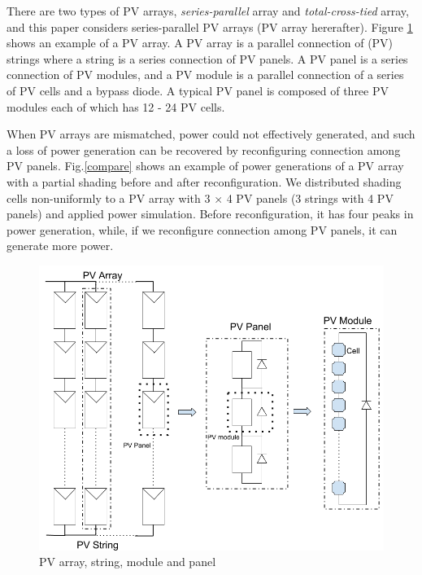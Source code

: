 \documentclass[conference]{IEEEtran}
\begin{document}



There are two types of PV arrays, \textit{series-parallel} array and \textit{total-cross-tied} array, and this paper considers series-parallel PV arrays (PV array hererafter).
Figure \ref{model} shows an example of a PV array. A PV array is a parallel connection of (PV) strings where a string is a series connection of PV panels. A PV panel is a series connection of PV modules, and a PV module is a parallel connection of a series of PV cells and a bypass diode. A typical PV panel is composed of three PV modules each of which has 12 - 24 PV cells. 

When PV arrays are mismatched, power could not effectively generated, and such a loss of power generation can be recovered by reconfiguring connection among PV panels.
Fig.\ref{compare} shows an example of power generations of a PV array with a partial shading before and after reconfiguration. We distributed shading cells non-uniformly to a PV array with 3 $\times$ 4 PV panels (3 strings with 4 PV panels) and applied power simulation. 
Before reconfiguration, it has four peaks in power generation, while, if we reconfigure connection among PV panels, it can generate more power. 

\begin{figure}[t]
    \centering
    \includegraphics[width=0.6\linewidth]{fig/module.png}
    \caption{PV array, string, module and panel}
    \label{model}
\end{figure}
\end{document}
